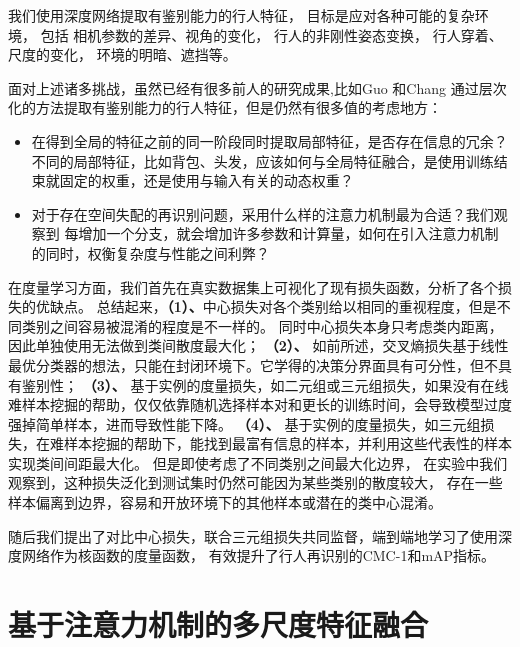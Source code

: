我们使用深度网络提取有鉴别能力的行人特征，
目标是应对各种可能的复杂环境，
包括
相机参数的差异、视角的变化，
行人的非刚性姿态变换，
行人穿着、尺度的变化，
环境的明暗、遮挡等。

面对上述诸多挑战，虽然已经有很多前人的研究成果,比如Guo \etal\cite{guo2018multilevel}和Chang \etal\cite{chang2018factor}通过层次化的方法提取有鉴别能力的行人特征，但是仍然有很多值的考虑地方：

\begin{itemize}
	\item \cite{zhao2017part} 在得到全局的特征之前的同一阶段同时提取局部特征，是否存在信息的冗余？
	      不同的局部特征，比如背包、头发，应该如何与全局特征融合，是使用训练结束就固定的权重，还是使用与输入有关的动态权重？
	\item 对于存在空间失配的再识别问题，采用什么样的注意力机制最为合适？我们观察到\cite{zhao2017part} 每增加一个分支，就会增加许多参数和计算量，如何在引入注意力机制的同时，权衡复杂度与性能之间利弊？
\end{itemize}

在度量学习方面，我们首先在真实数据集上可视化了现有损失函数，分析了各个损失的优缺点。
总结起来，\textbf{（1）、}中心损失对各个类别给以相同的重视程度，但是不同类别之间容易被混淆的程度是不一样的。
同时中心损失本身只考虑类内距离，因此单独使用无法做到类间散度最大化；
\textbf{（2）、}
如前所述，交叉熵损失基于线性最优分类器的想法，只能在封闭环境下。它学得的决策分界面具有可分性，但不具有鉴别性；
\textbf{（3）、}
基于实例的度量损失，如二元组或三元组损失，如果没有在线难样本挖掘的帮助\cite{yaqing2016semantics}，仅仅依靠随机选择样本对和更长的训练时间，会导致模型过度强掉简单样本，进而导致性能下降。
\textbf{（4）、}
基于实例的度量损失，如三元组损失，在难样本挖掘的帮助下，能找到最富有信息的样本，并利用这些代表性的样本实现类间间距最大化。
但是即使考虑了不同类别之间最大化边界，
在实验中我们观察到，这种损失泛化到测试集时仍然可能因为某些类别的散度较大，
存在一些样本偏离到边界，容易和开放环境下的其他样本或潜在的类中心混淆。

随后我们提出了对比中心损失，联合三元组损失共同监督，端到端地学习了使用深度网络作为核函数的度量函数，
有效提升了行人再识别的CMC-1和mAP指标。

\chapter{基于注意力机制的多尺度特征融合} \label{chap:attention}

